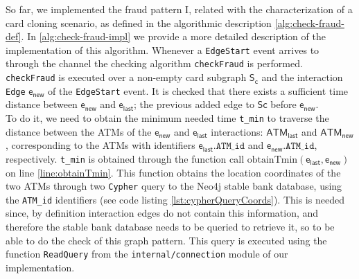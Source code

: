 \begin{itemize}
    So far, we implemented the fraud pattern I, related with the characterization of a card cloning scenario, as defined in the algorithmic description \ref{alg:check-fraud-def}. 
    In \ref{alg:check-fraud-impl} we provide a more detailed description of the implementation of this algorithm. Whenever a \texttt{EdgeStart} event arrives to \FW through the \internaledgech channel the checking algorithm \texttt{checkFraud} is performed. \texttt{checkFraud} is executed over a non-empty card subgraph $\mathsf{S_c}$ and the interaction \texttt{Edge} $\mathsf{e_{new}}$ of the \texttt{EdgeStart} event. It is checked that there exists a sufficient time distance between $\mathsf{e_{new}}$ and $\mathsf{e_{last}}$; the previous added edge to $\mathsf{Sc}$ before $\mathsf{e_{new}}$.\\
    
    To do it, we need to obtain the minimum needed time \texttt{t\_min} to traverse the distance between the ATMs of the $\mathsf{e_{new}}$ and $\mathsf{e_{last}}$ interactions: $\mathsf{ATM_{last}}$ and $\mathsf{ATM_{new}}$, corresponding to the ATMs with identifiers $\mathsf{e_{last}}.\texttt{ATM\_id}$ and $\mathsf{e_{new}}.\texttt{ATM\_id}$, respectively. \texttt{t\_min} is obtained through the function call $\text{obtainTmin}(\mathsf{e_{last}}, \mathsf{e_{new}})$ on line \ref{line:obtainTmin}. This function obtains the location coordinates of the two ATMs through two \texttt{Cypher} query to the Neo4j stable bank database, using the \texttt{ATM\_id} identifiers (see code listing \ref{lst:cypherQueryCoords}). This is needed since, by definition interaction edges do not contain this information, and therefore the stable bank database needs to be queried to retrieve it, so to be able to do the check of this graph pattern. This query is executed using the function \texttt{ReadQuery} from the \texttt{internal/connection} module of our \DPATM implementation.


\end{itemize}
